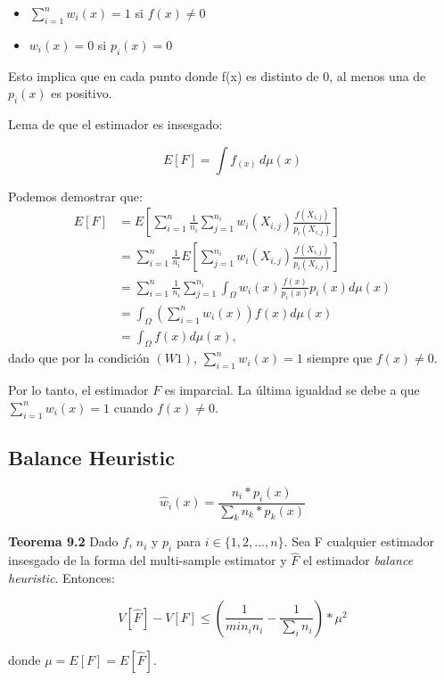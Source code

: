 \documentclass{article}
\begin{document}
\begin{itemize}
    \item $\sum_{i=1}^{n} w_{i}(x) = 1$ si $f(x) \neq 0$
    \item $w_{i}(x) = 0$ si $p_{i}(x) = 0$
\end{itemize}

Esto implica que en cada punto donde f(x) es distinto de 0, al menos una de $p_{i}(x)$ es positivo.

Lema de que el estimador es insesgado:

$$E[F] = \int f_(x) \,d\mu(x)$$

Podemos demostrar que:
\begin{align*}
E[F] &= E\left[\sum_{i=1}^n \frac{1}{n_i} \sum_{j=1}^{n_i} w_i(X_{i,j}) \frac{f(X_{i,j})}{p_i(X_{i,j})}\right] \\
&= \sum_{i=1}^n \frac{1}{n_i} E\left[\sum_{j=1}^{n_i} w_i(X_{i,j}) \frac{f(X_{i,j})}{p_i(X_{i,j})}\right] \\
&= \sum_{i=1}^n \frac{1}{n_i} \sum_{j=1}^{n_i} \int_{\Omega} w_i(x) \frac{f(x)}{p_i(x)} p_i(x) d\mu(x) \\
&= \int_{\Omega} \left(\sum_{i=1}^n w_i(x)\right) f(x) d\mu(x) \\
&= \int_{\Omega} f(x) d\mu(x),
\end{align*}
dado que por la condición \( (W1) \), \( \sum_{i=1}^n w_i(x) = 1 \) siempre que \( f(x) \neq 0 \).

Por lo tanto, el estimador \( F \) es imparcial. La última igualdad se debe a que \( \sum_{i=1}^n w_i(x) = 1 \) cuando \( f(x) \neq 0 \).

\subsection{Balance Heuristic}

$$ \hat{w}_{i}(x) = \frac{n_{i} * p_{i}(x)}{\sum_{k} n_{k} * p_{k}(x)}$$

\textbf{Teorema 9.2} Dado $f$, $n_{i}$ y $p_{i}$ para $i \in \{1, 2, ..., n\}$. Sea F cualquier estimador insesgado de la forma del multi-sample estimator y $\hat{F}$ el estimador \textit{balance heuristic}. Entonces:

$$V[\hat{F}] - V[F] \leq ( \frac{1}{min_{i} n_{i}} - \frac{1}{\sum_{i} n_{i}} ) * \mu^{2}$$

donde $\mu = E[F] = E[\hat{F}]$.



\end{document}
